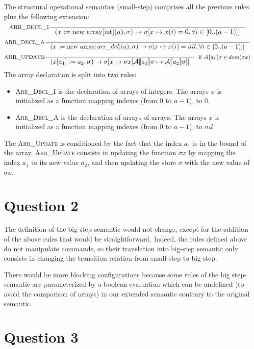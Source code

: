 \documentclass{article}
\begin{document}
The structural operational semantics (small-step) comprises all the previous rules plus the following extension:
\[
\inference[ARR\_DECL\_I]{}{(x := \text{new array[int]}(a), \sigma) \rightarrow
\sigma[x \mapsto x(i) = 0, \forall i \in [0 .. (a-1)] ]}
\]
\[
\inference[ARR\_DECL\_A]{}{(x := \text{new array[} \text{\textit{arr\_dcl}]}(a), \sigma) \rightarrow
\sigma[x \mapsto x(i) = nil, \forall i \in [0 .. (a-1)] ]}
\]
\[
\inference[ARR\_UPDATE]{}
    {(x[a_1] := a_2, \sigma) \rightarrow
     \sigma[x \mapsto \sigma x[\mathcal{A}\llbracket a_1 \rrbracket \sigma \mapsto \mathcal{A}\llbracket a_2 \rrbracket \sigma]]}
     [if \(\mathcal{A}\llbracket a_1\rrbracket \sigma \in dom(\sigma x)\)]
\]
The array declaration is split into two rules:
\begin{itemize}
 \item \textsc{Arr\_Decl\_I} is the declaration of arrays of integers. The arrays \(x\) is initialized as a function mapping indexes (from 0 to \(a-1\)), to 0.
 \item \textsc{Arr\_Decl\_A} is the declaration of arrays of arrays. The arrays \(x\) is initialized as a function mapping indexes (from 0 to \(a-1\)), to \(nil\).
\end{itemize}
The \textsc{Arr\_Update} is conditioned by the fact that the index \(a_1\) is in the bound of the array. \textsc{Arr\_Update} consists in updating the function \(\sigma x\) by mapping the index \(a_1\) to its new value \(a_2\), and then updating the store \(\sigma\) with the new value of \(\sigma x\).


\section*{Question 2}
The definition of the big-step semantic would not change, except for the addition of the above rules that would be straightforward.
Indeed, the rules defined above do not manipulate commands, so their translation into big-step semantic only consists in changing the transition relation from small-step to big-step.

There would be more blocking configurations because some rules of the big step-semantic are parameterized by a boolean evaluation which can be undefined (to avoid the comparison of arrays) in our extended semantic contrary to the original semantic.

\section*{Question 3}
\end{document}
